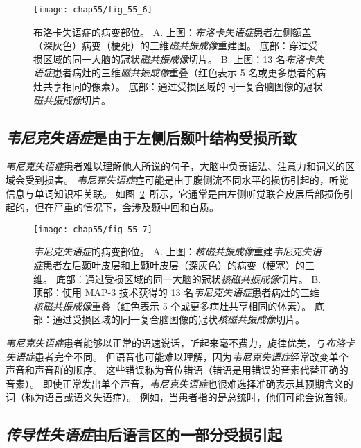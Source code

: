 \begin{figure}[htbp]
	\centering
	\texttt{[image: chap55/fig\_55\_6]}
	\caption{布洛卡失语症的病变部位。
		A. 上图：\textit{布洛卡失语症}患者左侧额盖（深灰色）病变（梗死）的三维\textit{磁共振成像}重建图。
		底部：穿过受损区域的同一大脑的冠状\textit{磁共振成像}切片。
		B. 上图：13 名\textit{布洛卡失语症}患者病灶的三维\textit{磁共振成像}重叠（红色表示 5 名或更多患者的病灶共享相同的像素）。
		底部：通过受损区域的同一复合脑图像的冠状\textit{磁共振成像}切片。}
	\label{fig:55_6}
\end{figure}



\subsection{\textit{韦尼克失语症}是由于左侧后颞叶结构受损所致}

\textit{韦尼克失语症}患者难以理解他人所说的句子，大脑中负责语法、注意力和词义的区域会受到损害。
\textit{韦尼克失语症}症可能是由于腹侧流不同水平的损伤引起的，听觉信息与单词知识相关联。
如图~\ref{fig:55_7}~所示，它通常是由左侧听觉联合皮层后部损伤引起的，但在严重的情况下，会涉及颞中回和白质。


\begin{figure}[htbp]
	\centering
	\texttt{[image: chap55/fig\_55\_7]}
	\caption{\textit{韦尼克失语症}的病变部位。
		A. 上图：\textit{核磁共振成像}重建\textit{韦尼克失语症}患者左后颞叶皮层和上颞叶皮层（深灰色）的病变（梗塞）的三维。
		底部：通过受损区域的同一大脑的冠状\textit{核磁共振成像}切片。
		B. 顶部：使用 MAP-3 技术获得的 13 名\textit{韦尼克失语症}患者病灶的三维\textit{核磁共振成像}重叠（红色表示 5 个或更多病灶共享相同的体素）。
		底部：通过受损区域的同一复合脑图像的冠状\textit{核磁共振成像}切片。}
	\label{fig:55_7}
\end{figure}


\textit{韦尼克失语症}患者能够以正常的语速说话，听起来毫不费力，旋律优美，与\textit{布洛卡失语症}患者完全不同。
但语音也可能难以理解，因为\textit{韦尼克失语症}经常改变单个声音和声音群的顺序。
这些错误称为音位错语（错语是用错误的音素代替正确的音素）。
即使正常发出单个声音，\textit{韦尼克失语症}也很难选择准确表示其预期含义的词（称为语言或语义失语症）。
例如，当患者指的是总统时，他们可能会说首领。


\subsection{\textit{传导性失语症}由后语言区的一部分受损引起}

